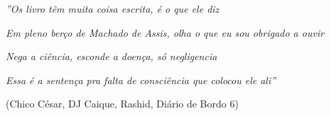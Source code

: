 
\begin{epigrafe}

\emph{''Os livro têm muita coisa escrita, é o que ele diz}

\emph{Em pleno berço de Machado de Assis, olha o que eu sou obrigado a ouvir}

\emph{Nega a ciência, esconde a doença, só negligencia}

\emph{Essa é a sentença pra falta de consciência que colocou ele ali''}

(Chico César, DJ Caique, Rashid, Diário de Bordo 6)

\end{epigrafe}

